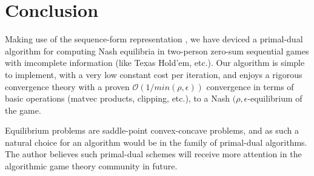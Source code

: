 \documentclass[envcountsame]{llcns2e/llncs}
\begin{document}
\section{Conclusion}
Making use of the sequence-form representation
\cite{koller1992complexity,von1996efficient,vonequilibrium}, we have
deviced a primal-dual algorithm for computing Nash equilibria in
two-person zero-sum sequential games with imcomplete information (like
Texas Hold'em, etc.). Our algorithm is simple to implement, with a
very low constant cost per iteration, and enjoys a rigorous
convergence theory with a proven $\mathcal{O}(1/min(\rho,\epsilon))$ convergence
in terms of basic operations (matvec products, clipping, etc.), to a
Nash $(\rho,\epsilon$-equilibrium of the game.

Equilibrium problems are saddle-point convex-concave problems, and as
such a natural choice for an algorithm would be in the family of
primal-dual algorithms. The author believes such primal-dual schemes
will receive more attention in the algorithmic game theory community
in future.


\medskip \noindent

\small


\end{document}
